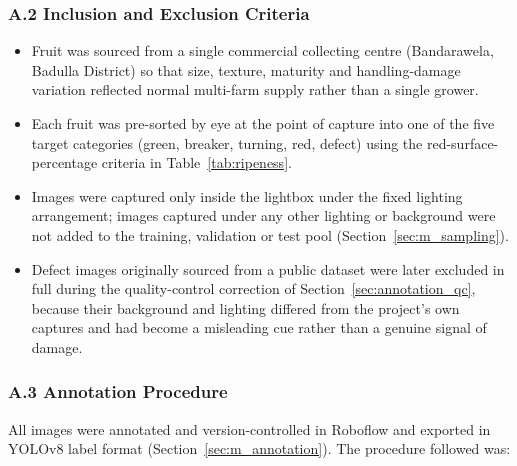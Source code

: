 \subsubsection*{A.2 Inclusion and Exclusion Criteria}

\begin{itemize}
    \item Fruit was sourced from a single commercial collecting centre (Bandarawela, Badulla District) so that size, texture, maturity and handling-damage variation reflected normal multi-farm supply rather than a single grower.
    \item Each fruit was pre-sorted by eye at the point of capture into one of the five target categories (green, breaker, turning, red, defect) using the red-surface-percentage criteria in Table~\ref{tab:ripeness}.
    \item Images were captured only inside the lightbox under the fixed lighting arrangement; images captured under any other lighting or background were not added to the training, validation or test pool (Section~\ref{sec:m_sampling}).
    \item Defect images originally sourced from a public dataset were later excluded in full during the quality-control correction of Section~\ref{sec:annotation_qc}, because their background and lighting differed from the project's own captures and had become a misleading cue rather than a genuine signal of damage.
\end{itemize}

\subsubsection*{A.3 Annotation Procedure}

All images were annotated and version-controlled in Roboflow \citep{dwyer2024} and exported in YOLOv8 label format (Section~\ref{sec:m_annotation}). The procedure followed was:


